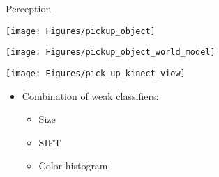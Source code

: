 \documentclass[a4paper,12pt]{article}
\newcommand{\emptylogo}{\texttt{[image: Figures/Empty]}}
\begin{document}
\begin{slidetop}
\begin{multicols}{2}
\begin{bclogo}[couleur = white, arrondi = 0.25, couleurBord = tuedarkblue, epBarre = 0, logo=\emptylogo]{\textcolor{tuedarkblue}{Perception}}
\bigskip
\begin{minipage}[T]{0.3\textwidth}
	\begin{center}
		\texttt{[image: Figures/pickup\_object]}
	\end{center}
\end{minipage}
\hfill
\begin{minipage}[T]{0.3\textwidth}
	\begin{center}
		\texttt{[image: Figures/pickup\_object\_world\_model]}
	\end{center}
\end{minipage}
\hfill
\begin{minipage}[T]{0.3\textwidth}
	\begin{center}
		\texttt{[image: Figures/pick\_up\_kinect\_view]}
	\end{center}
\end{minipage}
\begin{itemize}[itemsep = 0pt, parsep = 0pt, leftmargin=15pt]
	\item Combination of weak classifiers:
	\begin{itemize}[itemsep = 0pt, parsep = 0pt, leftmargin=15pt]
		\item Size
		\item SIFT
		\item Color histogram

\end{itemize}
\end{itemize}
\end{bclogo}
\end{multicols}
\end{slidetop}
\end{document}
